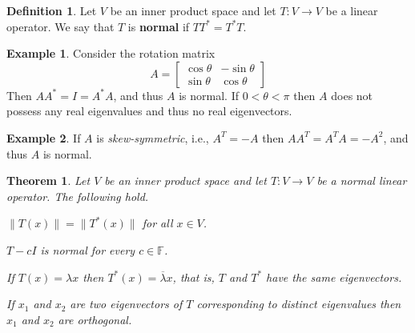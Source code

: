 \documentclass[12pt]{article}
\newcommand{\tv}{T:V\rightarrow V}
\newtheorem{theorem}{Theorem}[section]
\theoremstyle{definition}
\newtheorem{definition}{Definition}[section]
\newtheorem{example}{Example}[section]
\begin{document}
\begin{definition}
Let $V$ be an inner product space and let $\tv$ be a linear operator.  We say that $T$ is \textbf{normal} if $TT^*=T^*T$.
\end{definition}

\begin{example}
Consider the rotation matrix
\[
A = \begin{bmatrix} \cos\theta & -\sin\theta\\\sin\theta & \cos\theta\end{bmatrix}
\]
Then $AA^* = I = A^*A$, and thus $A$ is normal.  If $0<\theta<\pi$ then $A$ does not possess any real eigenvalues and thus no real eigenvectors.
\end{example}

\begin{example}
If $A$ is \textit{skew-symmetric}, i.e., $A^T = -A$ then $AA^T = A^TA = -A^2$, and thus $A$ is normal.
\end{example}

\begin{theorem}
Let $V$ be an inner product space and let $\tv$ be a normal linear operator.  The following hold.
\begin{compactenum}[(a)]
\item $\|T(x)\| = \|T^*(x)\|$ for all $x\in V$.
\item $T-cI$ is normal for every $c\in\mathbb{F}$.
\item If $T(x) = \lambda x$ then $T^*(x) = \overline{\lambda} x$, that is, $T$ and $T^*$ have the same eigenvectors.
\item If $x_1$ and $x_2$ are two eigenvectors of $T$ corresponding to distinct eigenvalues then $x_1$ and $x_2$ are orthogonal.
\end{compactenum}
\end{theorem}
\end{document}
